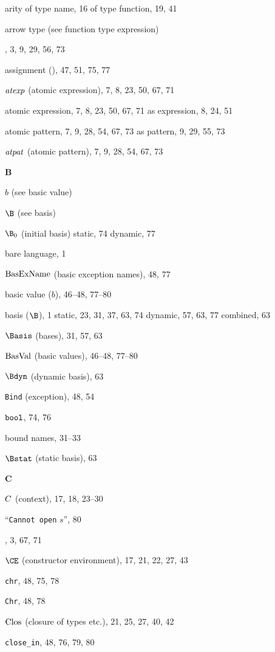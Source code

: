 \begin{theindex}
\item arity 
\subitem of type name, 16
\subitem of type function, 19, 41
\item arrow type (see function type expression) 
\item \AS, 3, 9, 29, 56, 73
\item assignment (\ml{:=}), 47, 51, 75, 77
\item ${\it atexp}$ (atomic expression), 7, 8, 23, 50, 67, 71
\item atomic expression, 7, 8, 23, 50, 67, 71
\subitem as expression, 8, 24, 51
\item atomic pattern, 7, 9, 28, 54, 67, 73
\subitem as pattern, 9, 29, 55, 73
\item ${\it atpat}$ (atomic pattern), 7, 9, 28, 54, 67, 73
\indexspace
\parbox{65mm}{\hfil{\large\bf B}\hfil}
\indexspace
\item $b$ (see basic value) 
\item $\B$ (see basis) 
\item $\B_0$ (initial basis) 
\subitem static, 74
\subitem dynamic, 77
\item bare language, 1
\item ${\rm BasExName}$ (basic exception names), 48, 77
\item basic value ($b$), 46--48, 77--80
\item basis ($\B$), 1
\subitem static, 23, 31, 37, 63, 74
\subitem dynamic, 57, 63, 77
\subitem combined, 63
\item $\Basis$ (bases), 31, 57, 63
\item ${\rm BasVal}$ (basic values), 46--48, 77--80
\item $\Bdyn$ (dynamic basis), 63
\item {\tt Bind} (exception), 48, 54
\item $\mbox{\tt bool}$, 74, 76
\item bound names, 31--33
\item $\Bstat$ (static basis), 63
\indexspace
\parbox{65mm}{\hfil{\large\bf C}\hfil}
\indexspace
\item $C$ (context), 17, 18, 23--30
\item ``{\tt Cannot open} $s$'', 80
\item \CASE, 3, 67, 71
\item $\CE$ (constructor environment), 17, 21, 22, 27, 43
\item {\tt chr}, 48, 75, 78
\item {\tt Chr}, 48, 78
\item ${\rm Clos}_{}$ (closure of types etc.), 21, 25, 27, 40, 42
\item \verb+close_in+, 48, 76, 79, 80

\end{theindex}
